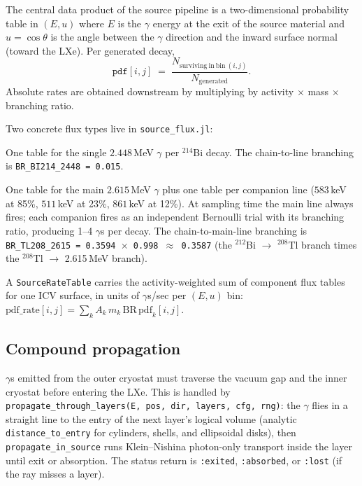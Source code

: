 \documentclass[11pt]{article}
\begin{document}
The central data product of the source pipeline is a two-dimensional
probability table in $(E, u)$ where $E$ is the $\gamma$ energy at the exit
of the source material and $u = \cos\theta$ is the angle between the
$\gamma$ direction and the inward surface normal (toward the LXe). Per
generated decay,
\begin{equation*}
\texttt{pdf}[i,j] \;=\; \frac{N_{\mathrm{surviving\ in\ bin\ }(i,j)}}{N_{\mathrm{generated}}}.
\end{equation*}
Absolute rates are obtained downstream by multiplying by activity $\times$
mass $\times$ branching ratio.

Two concrete flux types live in \texttt{source\_flux.jl}:

\begin{description}[leftmargin=2.0cm,style=nextline]
\item[\texttt{SourceFluxBi214}] One table for the single $2.448$\,MeV
$\gamma$ per $^{214}$Bi decay. The chain-to-line branching is
\texttt{BR\_BI214\_2448 = 0.015}.
\item[\texttt{SourceFluxTl208}] One table for the main $2.615$\,MeV $\gamma$
plus one table per companion line ($583$\,keV at 85\%, $511$\,keV at 23\%,
$861$\,keV at 12\%). At sampling time the main line always fires; each
companion fires as an independent Bernoulli trial with its branching ratio,
producing 1--4 $\gamma$s per decay. The chain-to-main-line branching is
\texttt{BR\_TL208\_2615 = 0.3594 $\times$ 0.998 $\approx$ 0.3587} (the
$^{212}$Bi $\to$ $^{208}$Tl branch times the $^{208}$Tl $\to$ 2.615\,MeV
branch).
\end{description}

A \texttt{SourceRateTable} carries the activity-weighted sum of component
flux tables for one ICV surface, in units of $\gamma$s/sec per $(E, u)$
bin: $\mathrm{pdf\_rate}[i,j] = \sum_k A_k\,m_k\,\mathrm{BR}\,\mathrm{pdf}_k[i,j]$.

\subsection{Compound propagation}
\label{sec:source-compound}

$\gamma$s emitted from the outer cryostat must traverse the vacuum gap and
the inner cryostat before entering the LXe. This is handled by
\texttt{propagate\_through\_layers(E, pos, dir, layers, cfg, rng)}: the
$\gamma$ flies in a straight line to the entry of the next layer's logical
volume (analytic \texttt{distance\_to\_entry} for cylinders, shells, and
ellipsoidal disks), then \texttt{propagate\_in\_source} runs Klein--Nishina
photon-only transport inside the layer until exit or absorption. The status
return is \texttt{:exited}, \texttt{:absorbed}, or \texttt{:lost} (if the
ray misses a layer).
\end{document}
